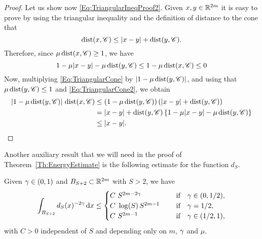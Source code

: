 \begin{proof}
Let us show now \eqref{Eq:TriangularIneqProof2}. Given $x,y \in \mathbb{R}^{2m}$ it is easy to prove by using the triangular inequality and the definition of distance to the cone that
\begin{equation} 
\label{Eq:TriangularCone}
\operatorname{dist}(x,\mathscr{C}) \leq |x-y| + \operatorname{dist}(y,\mathscr{C}).
\end{equation}
Therefore, since $\mu \operatorname{dist}(x,\mathscr{C})\geq 1$, we have
\begin{equation} 
\label{Eq:TriangularCone2}
1-\mu |x-y|- \mu \operatorname{dist}(y,\mathscr{C}) \leq 1-\mu\operatorname{dist}(x,\mathscr{C}) \leq 0
\end{equation}
Now, multiplying \eqref{Eq:TriangularCone} by $|1-\mu\operatorname{dist}(y,\mathscr{C})|$, and using that $\mu \operatorname{dist}(y,\mathscr{C})\leq 1$ and \eqref{Eq:TriangularCone2}, we obtain
\begin{align*}
|1-\mu\operatorname{dist}(y,\mathscr{C})|\,\operatorname{dist}(x,\mathscr{C}) &\leq (1-\mu\operatorname{dist}(y,\mathscr{C})) \left(|x-y| + \operatorname{dist}(y,\mathscr{C})\right) \\
&= |x-y|+\operatorname{dist}(y,\mathscr{C}) \left\{ 1 -\mu |x-y|- \mu \operatorname{dist}(y,\mathscr{C}) \right\} \\
&\leq |x-y|.
\end{align*}
\end{proof}

Another auxiliary result that we will need in the proof of Theorem~\ref{Th:EnergyEstimate} is the following estimate for the function $d_S$. 

\begin{lemma}
\label{Lemma:Integrability_dFunction}
Given $\gamma \in (0,1)$ and $B_{S+2}\subset \mathbb{R}^{2m}$ with $S>2$, we have
$$ \int_{B_{S+2}} d_S(x)^{-2\gamma} \,\mathrm{d} x \leq \begin{cases}
C \ S^{2m-2\gamma}\ \ \ \ &\textrm{if } \ \ \gamma\in(0,1/2),\\
C\ \log(S)\,S^{2m-1}\ \ \ \ &\textrm{if } \ \ \gamma=1/2,\\
C \ S^{2m-1}\ \ \ \ &\textrm{if } \ \ \gamma\in(1/2,1),\\
\end{cases} $$
with $C>0$ independent of $S$ and depending only on $m$, $\gamma$ and $\mu$.
\end{lemma}


